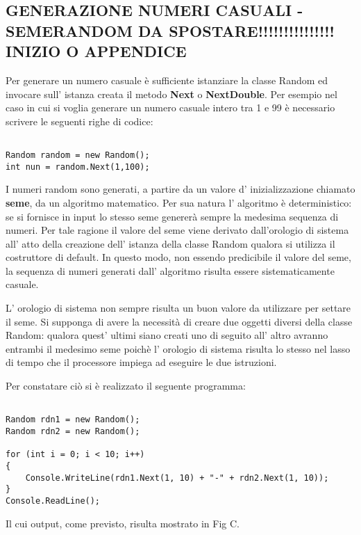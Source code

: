 \documentclass[11pt]{article}
\begin{document}
\subsection*{GENERAZIONE NUMERI CASUALI - SEMERANDOM DA SPOSTARE!!!!!!!!!!!!!!! INIZIO O APPENDICE}
\label{sec:SemiRandomS}

Per generare un numero casuale è sufficiente istanziare la classe Random ed invocare sull' istanza creata il metodo \textbf{Next} o \textbf{NextDouble}. Per esempio nel caso in cui si voglia generare un numero casuale intero tra 1 e 99 è necessario scrivere le seguenti righe di codice:

\begin{lstlisting}

Random random = new Random();
int nun = random.Next(1,100);

\end{lstlisting}

I numeri random sono generati, a partire da un valore d' inizializzazione chiamato \textbf{seme}, da un algoritmo matematico. Per sua natura l' algoritmo è deterministico: se si fornisce in input lo stesso seme genererà sempre la medesima sequenza di numeri. Per tale ragione il valore del seme viene derivato dall'orologio di sistema all' atto della  creazione dell' istanza della classe Random qualora si utilizza il costruttore di default. In questo modo, non essendo predicibile il valore del seme, la sequenza di numeri generati dall' algoritmo risulta essere sistematicamente casuale. 

L' orologio di sistema non sempre risulta un buon valore da utilizzare per settare il seme. Si supponga di avere la necessità di creare due oggetti diversi della classe Random: qualora quest’ ultimi siano creati uno di seguito all’ altro avranno entrambi il medesimo seme poichè l' orologio di sistema risulta lo stesso nel lasso di tempo che il processore impiega ad eseguire le due istruzioni.

Per constatare ciò si è realizzato il seguente programma:

\begin{lstlisting}

Random rdn1 = new Random();
Random rdn2 = new Random();

for (int i = 0; i < 10; i++)
{
    Console.WriteLine(rdn1.Next(1, 10) + "-" + rdn2.Next(1, 10));
}
Console.ReadLine();

\end{lstlisting}

Il cui output, come previsto, risulta mostrato in Fig C.
\end{document}
